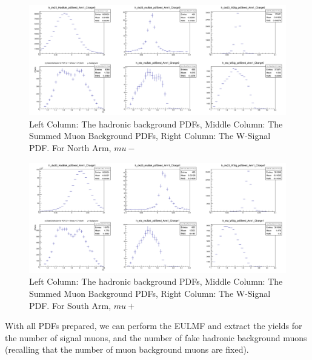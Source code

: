 \begin{figure}
  \centering
  \includegraphics[width=\linewidth]{././figures/c_dw23_Eta_PDF_Arm1_Charge0.png}
  \caption{
    Left Column: The hadronic background PDFs, Middle Column: The Summed Muon
    Background PDFs, Right Column: The W-Signal PDF. For North Arm, $mu-$
  }
  \label{fig:c_dw23_Eta_PDF_Arm1_Charge0}
\end{figure}

\begin{figure}
  \centering
  \includegraphics[width=\linewidth]{././figures/c_dw23_Eta_PDF_Arm1_Charge1.png}
  \caption{
    Left Column: The hadronic background PDFs, Middle Column: The Summed Muon
    Background PDFs, Right Column: The W-Signal PDF. For South Arm, $mu+$
  }
  \label{fig:c_dw23_Eta_PDF_Arm1_Charge1}
\end{figure}

With all PDFs prepared, we can perform the EULMF and extract the yields for the
number of signal muons, and the number of fake hadronic background muons
(recalling that the number of muon background muons are fixed).

